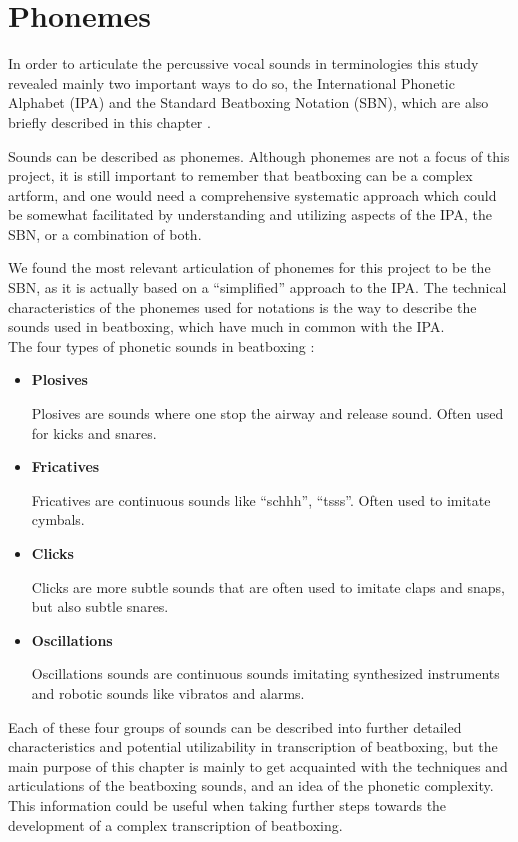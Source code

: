 \section{Phonemes}
\label{SBN}
In order to articulate the percussive vocal sounds in terminologies this study revealed mainly two important ways to do so, the International Phonetic Alphabet (IPA) \citep{ipa} and the Standard Beatboxing Notation (SBN), which are also briefly described in this chapter \citep{humanbeatboxing}.


Sounds can be described as phonemes. Although phonemes are not a focus of this project, it is still important to remember that beatboxing can be a complex artform, and one would need a comprehensive systematic approach which could be somewhat facilitated by understanding and utilizing aspects of the IPA, the SBN, or a combination of both.


We found the most relevant articulation of phonemes for this project to be the SBN, as it is actually based on a “simplified” approach to the IPA. The technical characteristics of the phonemes used for notations is the way to describe the sounds used in beatboxing, which have much in common with the IPA. \\


The four types of phonetic sounds in beatboxing \citep{BeatboxBible}:

  \begin{itemize} 
	\item\textbf{Plosives}

	
	Plosives are sounds where one stop the airway and release sound. Often used for kicks and snares.
  
	\item\textbf{Fricatives}
	
	
	{Fricatives are continuous sounds like “schhh”, “tsss”. Often used to imitate cymbals.}
	
	\item\textbf{Clicks}
	
	
	{Clicks are more subtle sounds that are often used to imitate claps and snaps, but also subtle snares.}
	
	\item\textbf{Oscillations}
	
	{Oscillations sounds are continuous sounds imitating synthesized instruments and robotic sounds like vibratos and alarms.}
\end{itemize}

Each of these four groups of sounds can be described into further detailed characteristics and potential utilizability in transcription of beatboxing, but the main purpose of this chapter is mainly to get acquainted with the techniques and articulations of the beatboxing sounds, and an idea of the phonetic complexity. This information could be useful when taking further steps towards the development of a complex transcription of beatboxing.
